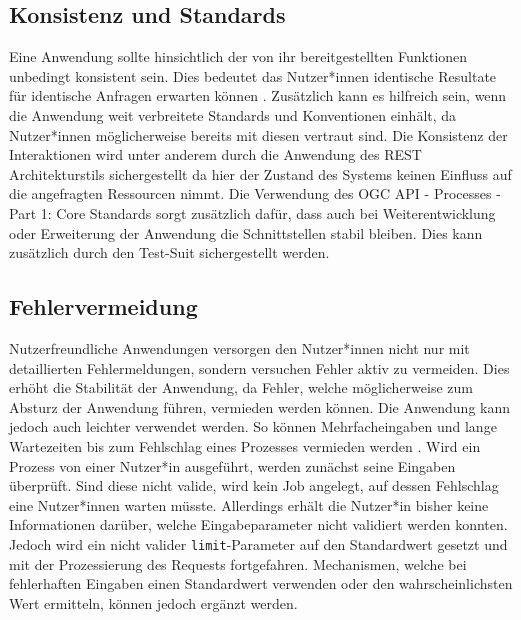 \subsection{Konsistenz und Standards}
Eine Anwendung sollte hinsichtlich der von ihr bereitgestellten Funktionen unbedingt konsistent sein. Dies bedeutet das 
Nutzer*innen identische Resultate für identische Anfragen erwarten können \cite{usability_engineering,nielsen_poster,heuristics_website}. 
Zusätzlich kann es hilfreich sein, wenn die Anwendung weit verbreitete Standards und Konventionen einhält, da Nutzer*innen möglicherweise 
bereits mit diesen vertraut sind.  
Die Konsistenz der Interaktionen wird unter anderem durch die Anwendung des REST Architekturstils sichergestellt da hier der Zustand des Systems keinen 
Einfluss auf die angefragten Ressourcen nimmt. Die Verwendung des OGC API - Processes - Part 1: Core Standards sorgt zusätzlich dafür, dass auch bei 
Weiterentwicklung oder Erweiterung der Anwendung die Schnittstellen stabil bleiben. Dies kann zusätzlich durch den Test-Suit sichergestellt werden.

\subsection{Fehlervermeidung}
Nutzerfreundliche Anwendungen versorgen den Nutzer*innen nicht nur mit detaillierten Fehlermeldungen, sondern versuchen Fehler aktiv zu vermeiden. 
Dies erhöht die Stabilität der Anwendung, da Fehler, welche möglicherweise zum Absturz der Anwendung führen, vermieden werden können. 
Die Anwendung kann jedoch auch leichter verwendet werden. So können Mehrfacheingaben und lange Wartezeiten bis zum Fehlschlag eines 
Prozesses vermieden werden \cite{usability_engineering,nielsen_poster,heuristics_website}. 
Wird ein Prozess von einer Nutzer*in ausgeführt, werden zunächst seine Eingaben überprüft. Sind diese nicht valide, wird kein Job angelegt, auf dessen 
Fehlschlag eine Nutzer*innen warten müsste. Allerdings erhält die Nutzer*in bisher keine Informationen darüber, welche Eingabeparameter nicht validiert werden 
konnten. Jedoch wird ein nicht valider \verb|limit|-Parameter auf den Standardwert gesetzt und mit der Prozessierung des Requests fortgefahren.
Mechanismen, welche bei fehlerhaften Eingaben einen Standardwert verwenden oder den wahrscheinlichsten Wert ermitteln, können jedoch ergänzt werden. 

